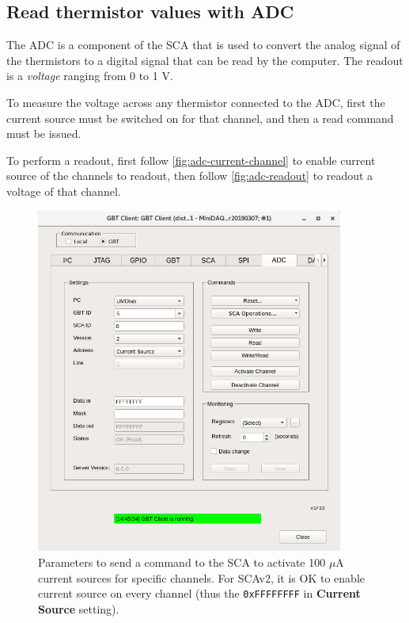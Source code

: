 \subsection{Read thermistor values with ADC}
The ADC is a component of the SCA that is used to convert the analog signal of
the thermistors to a digital signal that can be read by the computer.
The readout is a \emph{voltage} ranging from 0 to 1 V.

To measure the voltage across any thermistor connected to the ADC, first the
current source must be switched on for that channel, and then a read command
must be issued.

To perform a readout, first follow \autoref{fig:adc-current-channel} to enable
current source of the channels to readout,
then follow \autoref{fig:adc-readout} to readout a voltage of that channel.

\begin{figure}[ht]
    \centering
    \includegraphics[width=0.9\textwidth]{res/gbt_client_adc_readout_currentsource.png}
    \caption{
        Parameters to send a command to the SCA to activate 100 $\mu$A current
        sources for specific channels.
        For SCAv2, it is OK to enable current source on every channel (thus the
        \texttt{0xFFFFFFFF} in \textbf{Current Source} setting).
    }
    \label{fig:adc-current-channel}
\end{figure}


